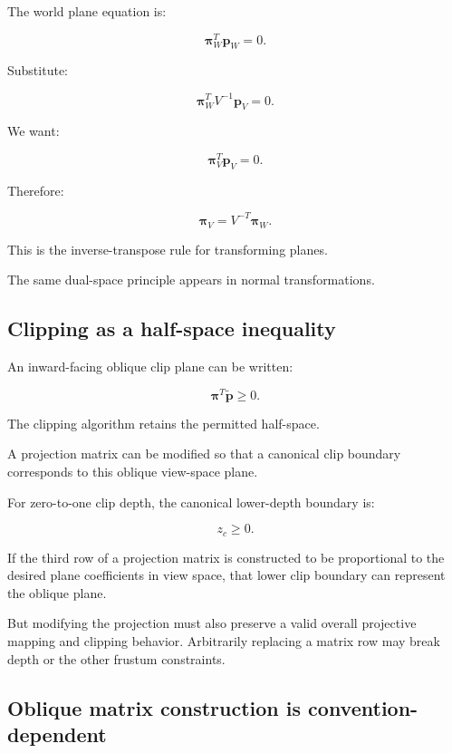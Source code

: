 The world plane equation is:

\[
 \boldsymbol\pi_W^T\mathbf p_W=0.
\]

Substitute:

\[
 \boldsymbol\pi_W^TV^{-1}\mathbf p_V=0.
\]

We want:

\[
 \boldsymbol\pi_V^T\mathbf p_V=0.
\]

Therefore:

\[
 \boxed{ \boldsymbol\pi_V=V^{-T}\boldsymbol\pi_W }.
\]

This is the inverse-transpose rule for transforming planes.

The same dual-space principle appears in normal transformations.

\subsection{Clipping as a half-space inequality}\label{02-foundations-ii-ch034-clipping-as-a-half-space-inequality}

\hypertarget{02-foundations-ii-ch034-clipping-as-a-half-space-inequality}{}

An inward-facing oblique clip plane can be written:

\[
 \boxed{ \boldsymbol\pi^T\tilde{\mathbf p}\ge0 }.
\]

The clipping algorithm retains the permitted half-space.

A projection matrix can be modified so that a canonical clip boundary corresponds to this oblique view-space plane.

For zero-to-one clip depth, the canonical lower-depth boundary is:

\[
 z_c\ge0.
\]

If the third row of a projection matrix is constructed to be proportional to the desired plane coefficients in view space, that lower clip boundary can represent the oblique plane.

But modifying the projection must also preserve a valid overall projective mapping and clipping behavior. Arbitrarily replacing a matrix row may break depth or the other frustum constraints.

\subsection{Oblique matrix construction is convention-dependent}\label{02-foundations-ii-ch034-oblique-matrix-construction-is-convention-dependent}

